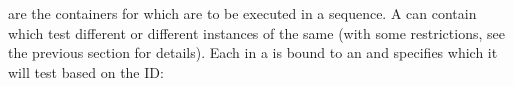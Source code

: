 \label{ConceptsTestJob}

\gdjobs{} are the containers for \gdsuites{} which are to be executed in a sequence. A \gdjob{} can contain \gdsuites{} which test different \gdauts{} or different instances of the same \gdaut{} (with some restrictions, see the previous section  for details). Each \gdsuite{} in a \gdjob{} is bound to an \gdaut{} and specifies which \gdaut{} it will test based on the \gdaut{} ID:  

